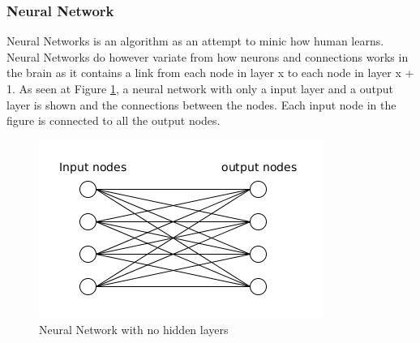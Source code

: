 \subsubsection{Neural Network}
Neural Networks is an algorithm as an attempt to minic how human learns.
Neural Networks do however variate from how neurons and connections works in the brain as it contains a link from each node in layer x to each node in layer x + 1. As seen at Figure \ref{fig:neuralnetwork}, a neural network with only a input layer and a output layer is shown and the connections between the nodes. Each input node in the figure is connected to all the output nodes.

\begin{figure}
  \centering
  \includegraphics[width=0.7\linewidth]{Images/neuralnetwork}
  \caption{Neural Network with no hidden layers}
  \label{fig:neuralnetwork}
\end{figure}

